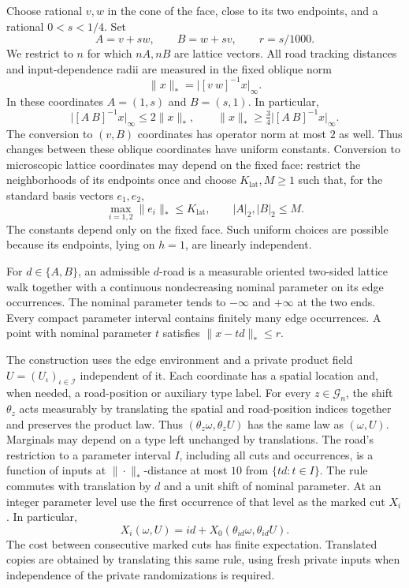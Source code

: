Choose rational $v,w$ in the cone of the face, close to its two
endpoints, and a rational $0<s<1/4$.  Set
\[
 A=v+sw,\qquad B=w+sv,\qquad r=s/1000.
\]
We restrict to $n$ for which $nA,nB$ are lattice vectors.  All road
tracking distances and input-dependence radii are measured in the fixed
oblique norm
\[
 \|x\|_* =\bigl|[v\ w]^{-1}x\bigr|_\infty.
\]
In these coordinates $A=(1,s)$ and $B=(s,1)$.  In particular,
\begin{equation}
 \bigl|[A\ B]^{-1}x\bigr|_\infty\le2\|x\|_* ,
 \qquad
 \|x\|_*\ge\tfrac34\bigl|[A\ B]^{-1}x\bigr|_\infty.
 \label{eq:fb-coordinate-comparison}
\end{equation}
The conversion to $(v,B)$ coordinates has operator norm at most $2$
as well.  Thus changes between these oblique coordinates have uniform
constants.  Conversion to microscopic lattice coordinates may depend
on the fixed face: restrict the neighborhoods of its endpoints once
and choose $K_{\mathrm{lat}},M\ge1$ such that, for the standard basis
vectors $e_1,e_2$,
\begin{equation}
 \max_{i=1,2}\|e_i\|_*\le K_{\mathrm{lat}},
 \qquad |A|_2,|B|_2\le M.
 \label{eq:fb-geometry-constants}
\end{equation}
The constants depend only on the fixed face.  Such uniform choices
are possible because its endpoints, lying on $h=1$, are linearly
independent.

\begin{definition}
\label{def:fb-road}
For $d\in\{A,B\}$, an admissible $d$-road is a measurable oriented
two-sided lattice walk together with a continuous nondecreasing nominal
parameter on its edge occurrences.  The nominal parameter tends to
$-\infty$ and $+\infty$ at the two ends.  Every compact parameter
interval contains finitely many edge occurrences.  A point with nominal
parameter $t$ satisfies $\|x-td\|_*\le r$.

The construction uses the edge environment and a private product field
$U=(U_\iota)_{\iota\in\mathcal I}$ independent of it. Each coordinate
has a spatial location and, when needed, a road-position or auxiliary
type label. For every $z\in\mathcal G_n$, the shift $\theta_z$ acts
measurably by translating the spatial and road-position indices together
and preserves the product law. Thus $(\theta_z\omega,\theta_zU)$ has
the same law as $(\omega,U)$. Marginals may depend on a type left
unchanged by translations. The road's restriction to
a parameter interval $I$, including all cuts and occurrences, is a
function of inputs at $\|\cdot\|_*$-distance at most $10$ from
$\{td:t\in I\}$.  The rule commutes with translation by $d$ and a unit
shift of nominal parameter.  At an integer parameter level use the
first occurrence of that level as the marked cut $X_i$.  In particular,
\begin{equation}
 X_i(\omega,U)
 =id+X_0(\theta_{id}\omega,\theta_{id}U).
 \label{eq:fb-cut-covariance}
\end{equation}
The cost between consecutive marked cuts has finite expectation.
Translated copies are obtained by translating this same rule, using
fresh private inputs when independence of the private randomizations
is required.
\end{definition}

